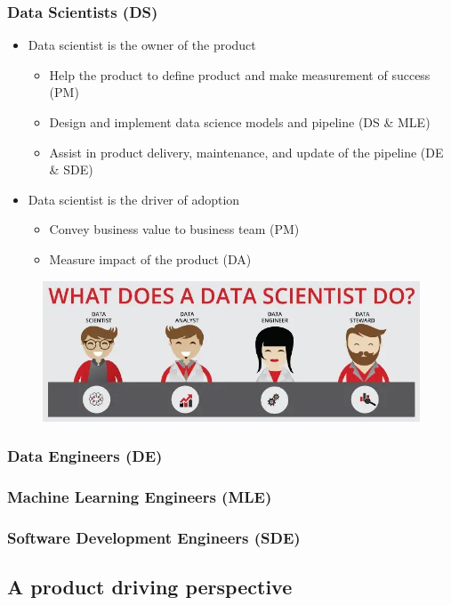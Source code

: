 \documentclass[aspectratio=169,xcolor=x11names,table]{beamer}
\begin{document}
\begin{frame}
	\frametitle{Data Scientists (DS)}
	\begin{itemize}
		\item Data scientist is the owner of the product
			\begin{itemize}
				\item Help the product to define product and make measurement of success (PM)
				\item Design and implement data science models and pipeline (DS \& MLE)
				\item Assist in product delivery, maintenance, and update of the pipeline (DE \& SDE)
			\end{itemize}
		\item Data scientist is the driver of adoption
			\begin{itemize}
				\item Convey business value to business team (PM)
				\item Measure impact of the product (DA)
			\end{itemize}
	\end{itemize}
	\vfill
	\begin{figure}
		\centering
		\includegraphics[width=0.8\linewidth]{data_scientist}
	\end{figure}
\end{frame}

\begin{frame}
	\frametitle{Data Engineers (DE)}
\end{frame}

\begin{frame}
	\frametitle{Machine Learning Engineers (MLE)}
\end{frame}

\begin{frame}
	\frametitle{Software Development Engineers (SDE)}
\end{frame}


\subsection{A product driving perspective}
\end{document}

